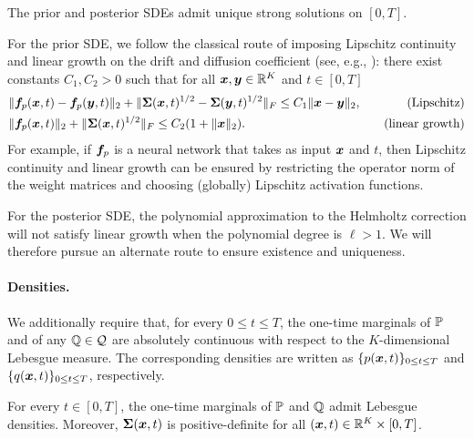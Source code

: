 \begin{assumption}\label{app:assum:regularity}
The prior and posterior SDEs admit unique strong solutions on $[0,T]$.
\end{assumption}

For the prior SDE, we follow the classical route of imposing Lipschitz continuity and linear growth on the drift and diffusion coefficient (see, e.g., \citet[Theorem 5.2.1]{oksendal2013stochastic}): there exist constants $C_1, C_2 > 0$ such that for all $\boldsymbol{x}, \boldsymbol{y} \in \mathbb{R}^K$ and $t \in [0, T]$
\begin{equation*}
\begin{aligned}
    &\|\boldsymbol{f}_p(\boldsymbol{x},t)- \boldsymbol{f}_p(\boldsymbol{y},t)\|_2 + \| \boldsymbol{\Sigma}(\boldsymbol{x}, t)^{1/2} -  \boldsymbol{\Sigma}(\boldsymbol{y}, t)^{1/2} \|_F \leq  C_1\|\boldsymbol{x} - \boldsymbol{y}\|_2, \quad &\text{(Lipschitz)}\\ 
    &\|\boldsymbol{f}_p(\boldsymbol{x},t)\|_2 + \|\boldsymbol{\Sigma}(\boldsymbol{x}, t)^{1/2}\|_F \leq  C_2(1+\|\boldsymbol{x}\|_2). \quad &\text{(linear growth)}
\end{aligned}
\end{equation*}
For example, if $\boldsymbol{f}_p$ is a neural network that takes as input $\boldsymbol{x}$ and $t$, then Lipschitz continuity and linear growth can be ensured by restricting the operator norm of the weight matrices and choosing (globally) Lipschitz activation functions. 

For the posterior SDE, the polynomial approximation to the Helmholtz correction will not satisfy linear growth when the polynomial degree is $\ell > 1$.
We will therefore pursue an alternate route to ensure existence and uniqueness.

\paragraph{Densities.}
We additionally require that, for every $0 \leq t \leq T$, the one-time marginals of $\mathbb{P}$ and of any $\mathbb{Q} \in \mathcal{Q}$ are absolutely continuous with respect to the $K$-dimensional Lebesgue measure. The corresponding densities are written as $\{p(\boldsymbol{x}, t)\}_{0 \leq t \leq T}$ and $\{q(\boldsymbol{x}, t)\}_{0 \leq t \leq T}$, respectively. 
 
\begin{assumption}\label{app:assum:densities}
For every $t\in[0,T]$, the one-time marginals of $\mathbb{P}$ and $\mathbb{Q}$ admit Lebesgue densities.
Moreover, $\boldsymbol{\Sigma}(\boldsymbol{x},t)$ is positive-definite for all $(\boldsymbol{x},t)\in\mathbb{R}^K\times[0,T]$.
\end{assumption}
 
